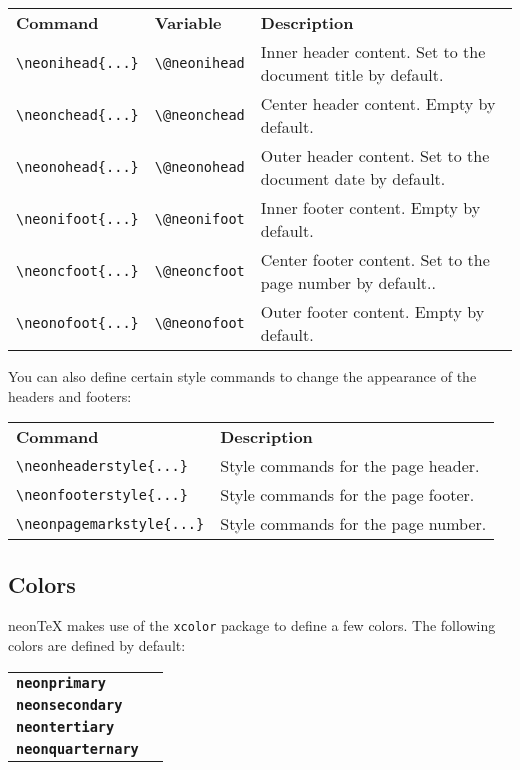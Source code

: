 \documentclass{neontex}
\begin{document}
	\begin{tabular}{ p{} p{} p{} }
		\textbf{Command} & \textbf{Variable} & \textbf{Description} \\
		\texttt{\textbackslash neonihead\{...\}} & \texttt{\textbackslash @neonihead} & Inner header content. Set to the document title by default. \\
		\texttt{\textbackslash neonchead\{...\}} & \texttt{\textbackslash @neonchead} & Center header content. Empty by default. \\
		\texttt{\textbackslash neonohead\{...\}} & \texttt{\textbackslash @neonohead} & Outer header content. Set to the document date by default. \\
		\texttt{\textbackslash neonifoot\{...\}} & \texttt{\textbackslash @neonifoot} & Inner footer content. Empty by default. \\
		\texttt{\textbackslash neoncfoot\{...\}} & \texttt{\textbackslash @neoncfoot} & Center footer content. Set to the page number by default.. \\
		\texttt{\textbackslash neonofoot\{...\}} & \texttt{\textbackslash @neonofoot} & Outer footer content. Empty by default. \\
	\end{tabular}

	You can also define certain style commands to change the appearance of the headers and footers:

	\begin{tabular}{ p{} p{} }
		\textbf{Command} & \textbf{Description} \\
		\texttt{\textbackslash neonheaderstyle\{...\}} & Style commands for the page header. \\
		\texttt{\textbackslash neonfooterstyle\{...\}} & Style commands for the page footer. \\
		\texttt{\textbackslash neonpagemarkstyle\{...\}} & Style commands for the page number.
	\end{tabular}

	\subsection{Colors}

	neonTeX makes use of the \texttt{xcolor} package to define a few colors. The following colors are defined by default:

	\begin{tabular}{ l l }
		{\color{neonprimary}\chivoblack \textbf{\texttt{neonprimary}}} \\
		{\color{neonsecondary}\chivoblack \textbf{\texttt{neonsecondary}}} \\
		{\color{neontertiary}\chivoblack \textbf{\texttt{neontertiary}}} \\
		{\color{neonquarternary}\chivoblack \textbf{\texttt{neonquarternary}}} \\
	\end{tabular}
\end{document}
